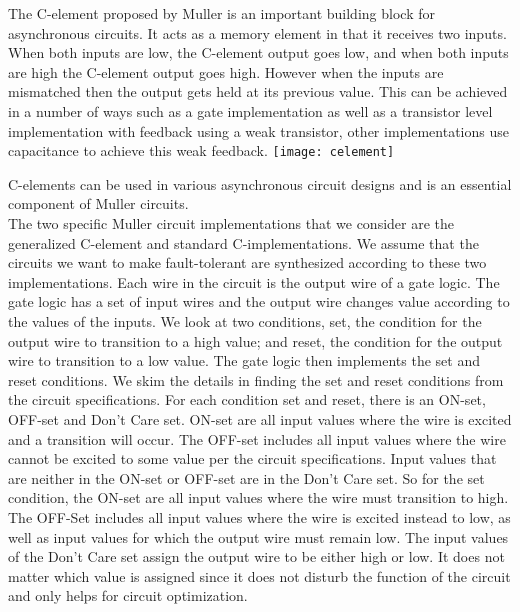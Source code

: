 \documentclass[12pt]{report}
\begin{document}
The C-element proposed by Muller is an important building block for asynchronous circuits.  It acts as a memory element in that it receives two inputs.  When both inputs are low, the C-element output goes low, and when both inputs are high the C-element output goes high.  However when the inputs are mismatched then the output gets held at its previous value.  This can be achieved in a number of ways such as a gate implementation as well as a transistor level implementation with feedback using a weak transistor, other implementations use capacitance to achieve this weak feedback.
\texttt{[image: celement]}

C-elements can be used in various asynchronous circuit designs and is an essential component of Muller circuits.  \\

The two specific Muller circuit implementations that we consider are the generalized C-element and standard C-implementations.  We assume that the circuits we want to make fault-tolerant are synthesized according to these two implementations.    
Each wire in the circuit is the output wire of a gate logic.  The gate logic has a set of input wires and the output wire changes value according to the values of the inputs.  We look at two conditions, set, the condition for the output wire to transition to a high value; and reset, the condition for the output wire to transition to a low value.  The gate logic then implements the set and reset conditions. 
We skim the details in finding the set and reset conditions from the circuit specifications. For each condition set and reset, there is an ON-set, OFF-set and Don't Care set.  ON-set are all input values where the wire is excited and a transition will occur.  The OFF-set includes all input values where the wire cannot be excited to some value per the circuit specifications.  Input values that are neither in the ON-set or OFF-set are in the Don't Care set.  So for the set condition, the ON-set are all input values where the wire must transition to high.  The OFF-Set includes all input values where the wire is excited instead to low, as well as input values for which the output wire must remain low.  The input values of the Don't Care set assign the output wire to be either high or low.  It does not matter which value is assigned since it does not disturb the function of the circuit and only helps for circuit optimization. \\
\end{document}
